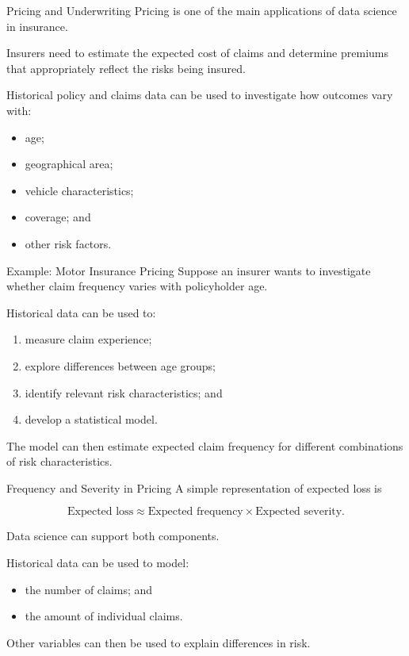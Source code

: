 \documentclass[
  ignorenonframetext,
  aspectratio=169,
]{beamer}
\providecommand{\tightlist}{%
  \setlength{\itemsep}{0pt}\setlength{\parskip}{0pt}}
\begin{document}
\begin{frame}{Pricing and Underwriting}
\protect{}\label{pricing-and-underwriting}
Pricing is one of the main applications of data science in insurance.

Insurers need to estimate the expected cost of claims and determine
premiums that appropriately reflect the risks being insured.

Historical policy and claims data can be used to investigate how
outcomes vary with:

\begin{itemize}
\tightlist
\item
  age;
\item
  geographical area;
\item
  vehicle characteristics;
\item
  coverage; and
\item
  other risk factors.
\end{itemize}
\end{frame}

\begin{frame}{Example: Motor Insurance Pricing}
\protect{}\label{example-motor-insurance-pricing}
Suppose an insurer wants to investigate whether claim frequency varies
with policyholder age.

Historical data can be used to:

\begin{enumerate}
\tightlist
\item
  measure claim experience;
\item
  explore differences between age groups;
\item
  identify relevant risk characteristics; and
\item
  develop a statistical model.
\end{enumerate}

The model can then estimate expected claim frequency for different
combinations of risk characteristics.
\end{frame}

\begin{frame}{Frequency and Severity in Pricing}
\protect{}\label{frequency-and-severity-in-pricing}
A simple representation of expected loss is

\[
\text{Expected loss}
\approx
\text{Expected frequency}
\times
\text{Expected severity}.
\]

Data science can support both components.

Historical data can be used to model:

\begin{itemize}
\tightlist
\item
  the number of claims; and
\item
  the amount of individual claims.
\end{itemize}

Other variables can then be used to explain differences in risk.
\end{frame}
\end{document}

